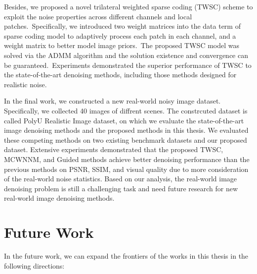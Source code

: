 Besides, we proposed a novel trilateral weighted sparse coding (TWSC) scheme to exploit the noise properties across different channels and local patches.\ Specifically, we introduced two weight matrices into the data term of sparse coding model to adaptively process each patch in each channel, and a weight matrix to better model image priors.\ The proposed TWSC model was solved via the ADMM algorithm and the solution existence and convergence can be guaranteed.\ Experiments demonstrated the superior performance of TWSC to the state-of-the-art denoising methods, including those methods designed for realistic noise.

In the final work, we constructed a new real-world noisy image dataset. Specifically, we collected 40 images of diffrent scenes. The constrcuted dataset is called PolyU Realistic Image dataset, on which we evaluate the state-of-the-art image denoising methods and the proposed methods in this thesis. We evaluated these competing methods on two existing benchmark datasets and our proposed dataset. Extensive experiments demonstrated that the proposed TWSC, MCWNNM, and Guided methods achieve better denoising performance than the previous methods on PSNR, SSIM, and visual quality due to more consideration of the real-world noise statistics. Based on our analysis, the real-world image denoising problem is still a challenging task and need future research for new real-world image denoising methods.

\section{Future Work}
\label{sec:conclusions:future}

In the future work, we can expand the frontiers of the works in this thesis in the following directions:

